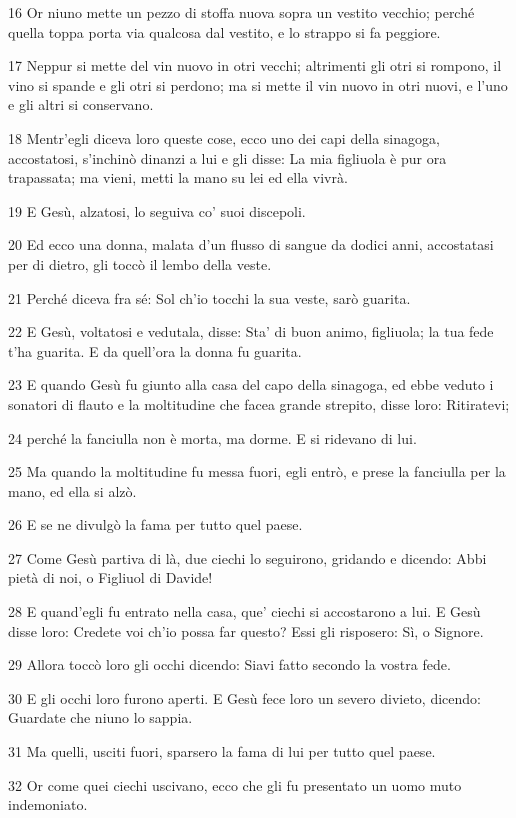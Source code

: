 \par 16 Or niuno mette un pezzo di stoffa nuova sopra un vestito vecchio; perché quella toppa porta via qualcosa dal vestito, e lo strappo si fa peggiore.
\par 17 Neppur si mette del vin nuovo in otri vecchi; altrimenti gli otri si rompono, il vino si spande e gli otri si perdono; ma si mette il vin nuovo in otri nuovi, e l'uno e gli altri si conservano.
\par 18 Mentr'egli diceva loro queste cose, ecco uno dei capi della sinagoga, accostatosi, s'inchinò dinanzi a lui e gli disse: La mia figliuola è pur ora trapassata; ma vieni, metti la mano su lei ed ella vivrà.
\par 19 E Gesù, alzatosi, lo seguiva co' suoi discepoli.
\par 20 Ed ecco una donna, malata d'un flusso di sangue da dodici anni, accostatasi per di dietro, gli toccò il lembo della veste.
\par 21 Perché diceva fra sé: Sol ch'io tocchi la sua veste, sarò guarita.
\par 22 E Gesù, voltatosi e vedutala, disse: Sta' di buon animo, figliuola; la tua fede t'ha guarita. E da quell'ora la donna fu guarita.
\par 23 E quando Gesù fu giunto alla casa del capo della sinagoga, ed ebbe veduto i sonatori di flauto e la moltitudine che facea grande strepito, disse loro: Ritiratevi;
\par 24 perché la fanciulla non è morta, ma dorme. E si ridevano di lui.
\par 25 Ma quando la moltitudine fu messa fuori, egli entrò, e prese la fanciulla per la mano, ed ella si alzò.
\par 26 E se ne divulgò la fama per tutto quel paese.
\par 27 Come Gesù partiva di là, due ciechi lo seguirono, gridando e dicendo: Abbi pietà di noi, o Figliuol di Davide!
\par 28 E quand'egli fu entrato nella casa, que' ciechi si accostarono a lui. E Gesù disse loro: Credete voi ch'io possa far questo? Essi gli risposero: Sì, o Signore.
\par 29 Allora toccò loro gli occhi dicendo: Siavi fatto secondo la vostra fede.
\par 30 E gli occhi loro furono aperti. E Gesù fece loro un severo divieto, dicendo: Guardate che niuno lo sappia.
\par 31 Ma quelli, usciti fuori, sparsero la fama di lui per tutto quel paese.
\par 32 Or come quei ciechi uscivano, ecco che gli fu presentato un uomo muto indemoniato.

